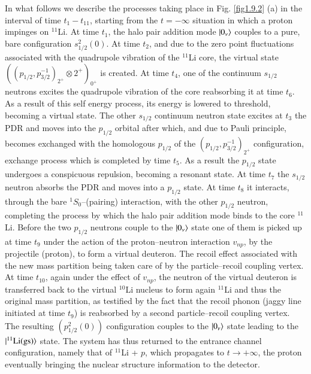 In what follows we describe the processes taking place in Fig. \ref{fig1.9.2} (a) in the interval of time $t_1-t_{11}$, starting from the $t=-\infty$ situation in which a proton impinges on $^{11}$Li. At time $t_1$, the halo pair addition mode $|{0_\nu} \rangle$ couples to a pure, bare configuration $s_{1/2}^2(0)$. At time $t_2$, and due to the zero point fluctuations associated with the quadrupole vibration of the $^{11}$Li core, the virtual state $((p_{1/2},p_{3/2}^{-1})_{2^+}\otimes 2^+)_{0^+}$ is created. At time $t_4$, one of the continuum $s_{1/2}$ neutrons excites the quadrupole vibration of the core reabsorbing it at time $t_6$. As a result of this self energy process, its energy is lowered to threshold, becoming a virtual state. The other $s_{1/2}$ continuum neutron state excites at $t_3$ the PDR and moves into the $p_{1/2}$ orbital after which, and due to Pauli principle, becomes exchanged with the homologous $p_{1/2}$ of the $(p_{1/2},p_{3/2}^{-1})_{2^+}$
configuration, exchange process which is completed by time $t_5$. As a result the $p_{1/2}$ state undergoes a conspicuous repulsion, becoming a resonant state. At time $t_7$ the $s_{1/2}$ neutron absorbs the PDR and moves into a $p_{1/2}$ state. At time $t_8$ it interacts, through the bare $^1S_0$--(pairing) interaction, with the other $p_{1/2}$ neutron, completing the process by which the halo pair addition mode binds to the core $^{11}$Li. Before the two $p_{1/2}$ neutrons couple to the $|{0_\nu} \rangle$ state one of them is picked up at time $t_9$ under the action of the proton--neutron interaction $v_{np}$, by the projectile (proton), to form a virtual deuteron. The recoil effect associated with the new mass partition being taken care of by the particle--recoil coupling vertex. At time $t_{10}$, again under the effect of $v_{np}$, the neutron of the virtual deuteron is transferred back to the virtual $^{10}$Li nucleus to form again $^{11}$Li and thus the original mass partition, as testified by the fact that the recoil phonon (jaggy line initiated at time $t_9$) is reabsorbed by a second particle--recoil coupling vertex. The resulting $(p^2_{1/2}(0))$ configuration couples to the $|{0_\nu} \rangle$ state leading to the $|{^{11}\text{Li(gs)}} \rangle$ state. The system has thus returned to the entrance channel configuration, namely that of $^{11}$Li + $p$, which propagates to $t\to+\infty$, the proton eventually bringing the nuclear structure information to the detector.


